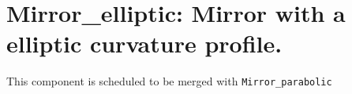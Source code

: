 \section{Mirror\_elliptic: Mirror with a elliptic curvature profile.}


This component is scheduled to be merged with \texttt{Mirror\_parabolic}

